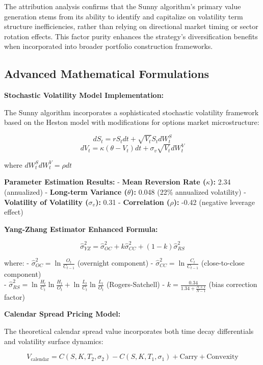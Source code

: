 \documentclass[
  american,
  11pt,
  11pt,
  letterpaper,
  onecolumn]{article}
\begin{document}
The attribution analysis confirms that the Sunny algorithm's primary
value generation stems from its ability to identify and capitalize on
volatility term structure inefficiencies, rather than relying on
directional market timing or sector rotation effects. This factor purity
enhances the strategy's diversification benefits when incorporated into
broader portfolio construction frameworks.

\newpage

\subsection{Advanced Mathematical
Formulations}\label{advanced-mathematical-formulations}

\textbf{Stochastic Volatility Model Implementation:}

The Sunny algorithm incorporates a sophisticated stochastic volatility
framework based on the Heston model with modifications for options
market microstructure:

\[dS_t = rS_t dt + \sqrt{V_t}S_t dW_t^S\]
\[dV_t = \kappa(\theta - V_t)dt + \sigma_v\sqrt{V_t}dW_t^V\]

where \(dW_t^S dW_t^V = \rho dt\)

\textbf{Parameter Estimation Results:} - \textbf{Mean Reversion Rate
(\(\kappa\)):} 2.34 (annualized) - \textbf{Long-term Variance
(\(\theta\)):} 0.048 (22\% annualized volatility) - \textbf{Volatility
of Volatility (\(\sigma_v\)):} 0.31 - \textbf{Correlation (\(\rho\)):}
-0.42 (negative leverage effect)

\textbf{Yang-Zhang Estimator Enhanced Formula:}

\[\hat{\sigma}_{YZ}^2 = \hat{\sigma}_{OC}^2 + k\hat{\sigma}_{CC}^2 + (1-k)\hat{\sigma}_{RS}^2\]

where: - \(\hat{\sigma}_{OC}^2 = \ln\frac{O_t}{C_{t-1}}\) (overnight
component) - \(\hat{\sigma}_{CC}^2 = \ln\frac{C_t}{C_{t-1}}\)
(close-to-close component)\\
-
\(\hat{\sigma}_{RS}^2 = \ln\frac{H_t}{C_t}\ln\frac{H_t}{O_t} + \ln\frac{L_t}{C_t}\ln\frac{L_t}{O_t}\)
(Rogers-Satchell) - \(k = \frac{0.34}{1.34 + \frac{N+1}{N-1}}\) (bias
correction factor)

\textbf{Calendar Spread Pricing Model:}

The theoretical calendar spread value incorporates both time decay
differentials and volatility surface dynamics:

\[V_{\text{calendar}} = C(S,K,T_2,\sigma_2) - C(S,K,T_1,\sigma_1) + \text{Carry} + \text{Convexity}\]
\end{document}
